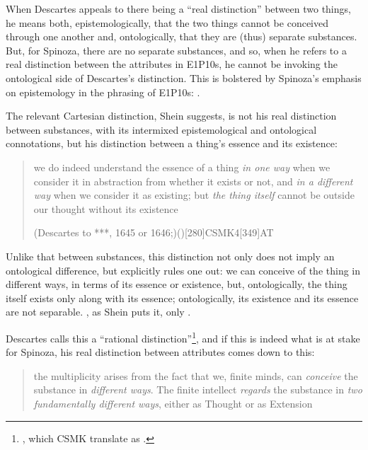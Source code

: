 \documentclass[11pt]{article}
\begin{document}
	When Descartes appeals to there being a \enquote{real distinction} between two things, he means both, epistemologically, that the two things cannot be conceived through one another and, ontologically, that they are (thus) separate substances. But, for Spinoza, there are no separate substances, and so, when he refers to a real distinction between the attributes in E1P10s, he cannot be invoking the ontological side of Descartes’s distinction. This is bolstered by Spinoza’s emphasis on epistemology in the phrasing of E1P10s: .
	
	The relevant Cartesian distinction, Shein suggests, is not his real distinction between substances, with its intermixed epistemological and ontological connotations, but his distinction between a thing’s essence and its existence:\blockquote[{\avolcites(Descartes to ***, 1645 or 1646;)(){}[280]{CSMK}{4}[349]{AT}}][.]{we do indeed understand the essence of a thing \emph{in one way} when we consider it in abstraction from whether it exists or not, and \emph{in a different way} when we consider it as existing; but \emph{the thing itself} cannot be outside our thought without its existence} Unlike that between substances, this distinction not only does not imply an ontological difference, but explicitly rules one out: we can conceive of the thing in different ways, in terms of its essence or existence, but, ontologically, the thing itself exists only along with its essence; ontologically, its existence and its essence are not separable. , as Shein puts it, only .
	
	Descartes calls this a \enquote{rational distinction}\footnote{, which CSMK translate as .}, and if this is indeed what is at stake for Spinoza, his real distinction between attributes comes down to this: \blockquote[{\autocites()(my emphases)[529]{Shein2009}}]{the multiplicity arises from the fact that we, finite minds, can \emph{conceive} the substance in \emph{different ways}. The finite intellect \emph{regards} the substance in\emph{ two fundamentally different ways}, either as Thought or as Extension}.
	
\end{document}
